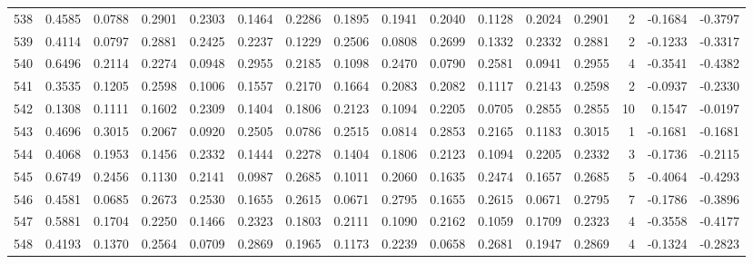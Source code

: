 \begin{tabular}{lrrrrrrrrrrrrrrr}
538 &      0.4585 &  0.0788 &  0.2901 &  0.2303 &  0.1464 &  0.2286 &  0.1895 &  0.1941 &  0.2040 &  0.1128 &   0.2024 &     0.2901 &      2 &                   -0.1684 &                    -0.3797 \\
539 &      0.4114 &  0.0797 &  0.2881 &  0.2425 &  0.2237 &  0.1229 &  0.2506 &  0.0808 &  0.2699 &  0.1332 &   0.2332 &     0.2881 &      2 &                   -0.1233 &                    -0.3317 \\
540 &      0.6496 &  0.2114 &  0.2274 &  0.0948 &  0.2955 &  0.2185 &  0.1098 &  0.2470 &  0.0790 &  0.2581 &   0.0941 &     0.2955 &      4 &                   -0.3541 &                    -0.4382 \\
541 &      0.3535 &  0.1205 &  0.2598 &  0.1006 &  0.1557 &  0.2170 &  0.1664 &  0.2083 &  0.2082 &  0.1117 &   0.2143 &     0.2598 &      2 &                   -0.0937 &                    -0.2330 \\
542 &      0.1308 &  0.1111 &  0.1602 &  0.2309 &  0.1404 &  0.1806 &  0.2123 &  0.1094 &  0.2205 &  0.0705 &   0.2855 &     0.2855 &     10 &                    0.1547 &                    -0.0197 \\
543 &      0.4696 &  0.3015 &  0.2067 &  0.0920 &  0.2505 &  0.0786 &  0.2515 &  0.0814 &  0.2853 &  0.2165 &   0.1183 &     0.3015 &      1 &                   -0.1681 &                    -0.1681 \\
544 &      0.4068 &  0.1953 &  0.1456 &  0.2332 &  0.1444 &  0.2278 &  0.1404 &  0.1806 &  0.2123 &  0.1094 &   0.2205 &     0.2332 &      3 &                   -0.1736 &                    -0.2115 \\
545 &      0.6749 &  0.2456 &  0.1130 &  0.2141 &  0.0987 &  0.2685 &  0.1011 &  0.2060 &  0.1635 &  0.2474 &   0.1657 &     0.2685 &      5 &                   -0.4064 &                    -0.4293 \\
546 &      0.4581 &  0.0685 &  0.2673 &  0.2530 &  0.1655 &  0.2615 &  0.0671 &  0.2795 &  0.1655 &  0.2615 &   0.0671 &     0.2795 &      7 &                   -0.1786 &                    -0.3896 \\
547 &      0.5881 &  0.1704 &  0.2250 &  0.1466 &  0.2323 &  0.1803 &  0.2111 &  0.1090 &  0.2162 &  0.1059 &   0.1709 &     0.2323 &      4 &                   -0.3558 &                    -0.4177 \\
548 &      0.4193 &  0.1370 &  0.2564 &  0.0709 &  0.2869 &  0.1965 &  0.1173 &  0.2239 &  0.0658 &  0.2681 &   0.1947 &     0.2869 &      4 &                   -0.1324 &                    -0.2823 \\

\end{tabular}
